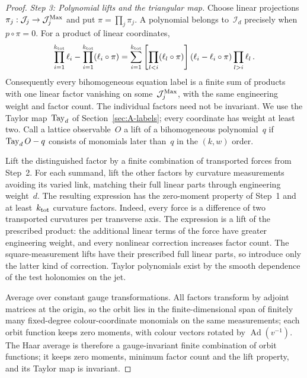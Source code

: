 \begin{proof}
\emph{Step 3: Polynomial lifts and the triangular map.} Choose linear projections $\pi_j:\mathcal J_j\to\mathcal J_j^{\rm Max}$ and put $\pi=\prod_j\pi_j$. A polynomial belongs to~$\mathcal I_d$ precisely when $p\circ\pi=0$. For a product of linear coordinates,
\begin{equation*}
\prod_{i=1}^{k_{\rm tot}}\ell_i-\prod_{i=1}^{k_{\rm tot}}(\ell_i\circ\pi)
=\sum_{i=1}^{k_{\rm tot}}\left[\prod_{l<i}(\ell_l\circ\pi)\right]
(\ell_i-\ell_i\circ\pi)\prod_{l>i}\ell_l\,.
\end{equation*}
Consequently every bihomogeneous equation label is a finite sum of products with one linear factor vanishing on some~$\mathcal J_j^{\rm Max}$, with the same engineering weight and factor count. The individual factors need not be invariant. We use the Taylor map~$\operatorname{Tay}_{d}$ of Section~\ref{sec:A-labels}; every coordinate has weight at least two. Call a lattice observable~$O$ a lift of a bihomogeneous polynomial~$q$ if $\operatorname{Tay}_{d}O-q$ consists of monomials later than~$q$ in the $(k,w)$ order.

Lift the distinguished factor by a finite combination of transported forces from Step~2. For each summand, lift the other factors by curvature measurements avoiding its varied link, matching their full linear parts through engineering weight~$d$. The resulting expression has the zero-moment property of Step~1 and at least~$k_{\rm tot}$ curvature factors. Indeed, every force is a difference of two transported curvatures per transverse axis. The expression is a lift of the prescribed product: the additional linear terms of the force have greater engineering weight, and every nonlinear correction increases factor count. The square-measurement lifts have their prescribed full linear parts, so introduce only the latter kind of correction. Taylor polynomials exist by the smooth dependence of the test holonomies on the jet.

Average over constant gauge transformations. All factors transform by adjoint matrices at the origin, so the orbit lies in the finite-dimensional span of finitely many fixed-degree colour-coordinate monomials on the same measurements; each orbit function keeps zero moments, with colour vectors rotated by $\operatorname{Ad}(v^{-1})$. The Haar average is therefore a gauge-invariant finite combination of orbit functions; it keeps zero moments, minimum factor count and the lift property, and its Taylor map is invariant.


\end{proof}
